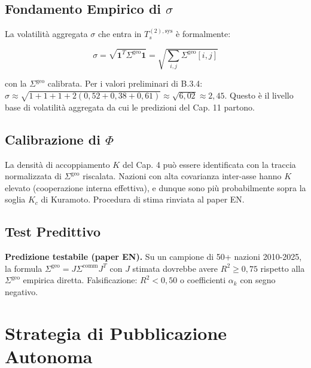 \subsection{\texorpdfstring{Fondamento Empirico di
\(\sigma\)}{Fondamento Empirico di \textbackslash sigma}}\label{fondamento-empirico-di-sigma}

La volatilità aggregata \(\sigma\) che entra in \(T_s^{(2),\text{sys}}\)
è formalmente:

\[
\sigma = \sqrt{\boldsymbol{1}^T \Sigma^{\text{geo}} \boldsymbol{1}} = \sqrt{\sum_{i,j} \Sigma^{\text{geo}}[i,j]}
\]

con la \(\Sigma^{\text{geo}}\) calibrata. Per i valori preliminari di
B.3.4:
\(\hat\sigma \approx \sqrt{1+1+1+2(0{,}52+0{,}38+0{,}61)} \approx \sqrt{6{,}02} \approx 2{,}45\).
Questo è il livello base di volatilità aggregata da cui le predizioni
del Cap. 11 partono.

\subsection{\texorpdfstring{Calibrazione di
\(\Phi\)}{Calibrazione di \textbackslash Phi}}\label{calibrazione-di-phi}

\Hypoth{} La densità di accoppiamento \(K\) del Cap. 4 può essere
identificata con la traccia normalizzata di \(\Sigma^{\text{geo}}\)
riscalata. Nazioni con alta covarianza inter-asse hanno \(K\) elevato
(cooperazione interna effettiva), e dunque sono più probabilmente sopra
la soglia \(K_c\) di Kuramoto. Procedura di stima rinviata al paper EN.

\subsection{Test Predittivo}\label{test-predittivo}

\Conj{} \textbf{Predizione testabile (paper EN).} Su un campione di 50+
nazioni 2010-2025, la formula
\(\Sigma^{\text{geo}} = J \Sigma^{\text{comm}} J^T\) con \(J\) stimata
dovrebbe avere \(R^2 \geq 0{,}75\) rispetto alla \(\Sigma^{\text{geo}}\)
empirica diretta. Falsificazione: \(R^2 < 0{,}50\) o coefficienti
\(\alpha_k\) con segno negativo.



\section{Strategia di Pubblicazione
Autonoma}\label{strategia-di-pubblicazione-autonoma}

